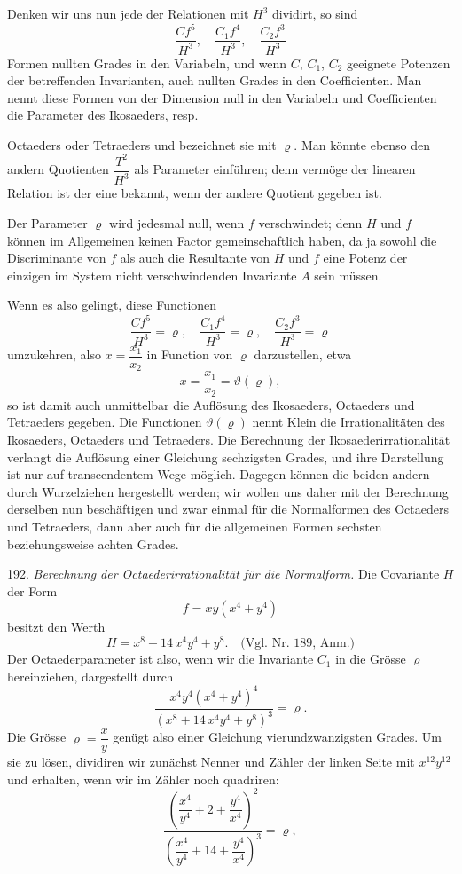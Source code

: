 Denken wir uns nun jede der Relationen mit $H^3$ dividirt, so sind
\[
\frac{Cf^5}{H^3},\quad \frac{C_1f^4}{H^3},\quad \frac{C_2f^3}{H^3}
\]
Formen nullten Grades in den Variabeln, und wenn $C$, $C_1$, $C_2$ geeignete Potenzen der betreffenden Invarianten, auch nullten Grades in den Coefficienten. Man nennt diese Formen von der Dimension null in den Variabeln und Coefficienten die Parameter des Ikosaeders, resp.


Octaeders oder Tetraeders und bezeichnet sie mit $\varrho$. Man könnte ebenso den andern Quotienten $\dfrac{T^2}{H^3}$ als Parameter einführen; denn vermöge der linearen Relation ist der eine bekannt, wenn der andere Quotient gegeben ist.

Der Parameter $\varrho$ wird jedesmal null, wenn $f$ verschwindet; denn $H$ und $f$ können im Allgemeinen keinen Factor gemeinschaftlich haben, da ja sowohl die Discriminante von $f$ als auch die Resultante von $H$ und $f$ eine Potenz der einzigen im System nicht verschwindenden Invariante $A$ sein müssen.

Wenn es also gelingt, diese Functionen
\[
\frac{Cf^5}{H^3}=\varrho,\quad \frac{C_1f^4}{H^3}=\varrho,\quad \frac{C_2f^3}{H^3}=\varrho
\]
umzukehren, also $x=\dfrac{x_1}{x_2}$ in Function von $\varrho$ darzustellen, etwa
\[
x=\frac{x_1}{x_2}=\vartheta(\varrho),
\]
so ist damit auch unmittelbar die Auflösung des Ikosaeders, Octaeders und Tetraeders gegeben. Die Functionen $\vartheta(\varrho)$ nennt Klein die Irrationalitäten des Ikosaeders, Octaeders und Tetraeders. Die Berechnung der Ikosaederirrationalität verlangt die Auflösung einer Gleichung sechzigsten Grades, und ihre Darstellung ist nur auf transcendentem Wege möglich. Dagegen können die beiden andern durch Wurzelziehen hergestellt werden; wir wollen uns daher mit der Berechnung derselben nun beschäftigen und zwar einmal für die Normalformen des Octaeders und Tetraeders, dann aber auch für die allgemeinen Formen sechsten beziehungsweise achten Grades.

192. \textit{Berechnung der Octaederirrationalität für die Normalform.} Die Covariante $H$ der Form
\[
f=xy(x^4+y^4)
\]
besitzt den Werth
\[
H=x^8+14\,x^4y^4+y^8. \quad \text{(Vgl. Nr. 189, Anm.)}
\]
Der Octaederparameter ist also, wenn wir die Invariante $C_1$ in die Grösse $\varrho$ hereinziehen, dargestellt durch
\[
\frac{x^4y^4(x^4+y^4)^4}{(x^8+14\,x^4y^4+y^8)^3}=\varrho.
\]
Die Grösse $\varrho=\dfrac{x}{y}$ genügt also einer Gleichung vierundzwanzigsten Grades. Um sie zu lösen, dividiren wir zunächst Nenner und Zähler der linken Seite mit $x^{12}y^{12}$ und erhalten, wenn wir im Zähler noch quadriren:
\[
\frac{\left(\dfrac{x^4}{y^4}+2+\dfrac{y^4}{x^4}\right)^2}{\left(\dfrac{x^4}{y^4}+14+\dfrac{y^4}{x^4}\right)^3}=\varrho,
\]


